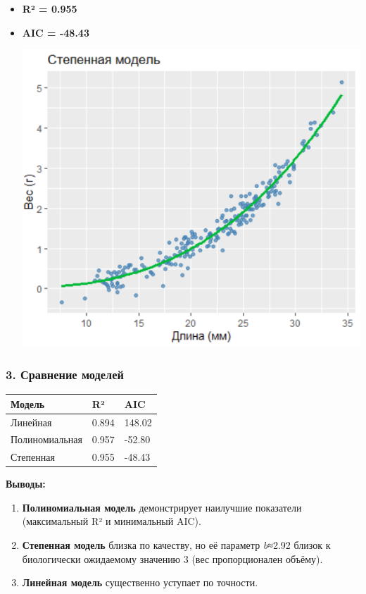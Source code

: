 \documentclass[
  letterpaper,
  DIV=11,
  numbers=noendperiod]{scrreprt}
\begin{document}
\begin{itemize}
\item
  \textbf{R² = 0.955}
\item
  \textbf{AIC = -48.43} \begin{center}
  \includegraphics[width=0.6\linewidth,height=\textheight,keepaspectratio]{images/power_shrimp.PNG}
  \end{center}
\end{itemize}

\subsubsection{\texorpdfstring{\textbf{3. Сравнение
моделей}}{3. Сравнение моделей}}\label{ux441ux440ux430ux432ux43dux435ux43dux438ux435-ux43cux43eux434ux435ux43bux435ux439-1}

\begin{longtable}[]{@{}lll@{}}
\toprule\noalign{}
\textbf{Модель} & \textbf{R²} & \textbf{AIC} \\
\midrule\noalign{}
\endhead
\bottomrule\noalign{}
\endlastfoot
Линейная & 0.894 & 148.02 \\
Полиномиальная & 0.957 & -52.80 \\
Степенная & 0.955 & -48.43 \\
\end{longtable}

\textbf{Выводы:}

\begin{enumerate}
\def\labelenumi{\arabic{enumi}.}
\item
  \textbf{Полиномиальная модель} демонстрирует наилучшие показатели
  (максимальный R² и минимальный AIC).
\item
  \textbf{Степенная модель} близка по качеству, но её параметр
  \emph{b}≈2.92 близок к биологически ожидаемому значению 3 (вес
  пропорционален объёму).
\item
  \textbf{Линейная модель} существенно уступает по точности.
\end{enumerate}
\end{document}
